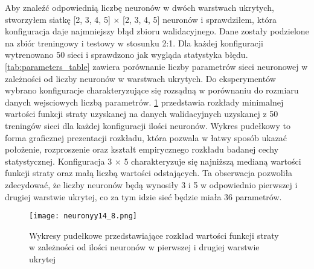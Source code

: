 \documentclass[11pt]{book}
\theoremstyle{definition}
\begin{document}
Aby znaleźć odpowiednią liczbę neuronów w dwóch warstwach ukrytych, stworzyłem siatkę [2, 3, 4, 5] $\times$ [2, 3, 4, 5] neuronów i sprawdziłem, która konfiguracja daje najmniejszy błąd zbioru walidacyjnego. Dane zostały podzielone na zbiór treningowy i testowy w stosunku 2:1. Dla każdej konfiguracji wytrenowano 50 sieci i sprawdzono jak wygląda statystyka błędu. \tablename{} \ref{tab:parameters_table} zawiera porównanie liczby parametrów sieci neuronowej w zależności od liczby neuronów w warstwach ukrytych. Do eksperymentów wybrano konfiguracje charakteryzujące się rozsądną w porównaniu do rozmiaru danych wejsciowych liczbą parametrów. \figurename{} \ref{fig:neurony} przedstawia rozkłady minimalnej wartości funkcji straty uzyskanej na danych walidacyjnych uzyskanej z 50 treningów sieci dla każdej konfiguracji ilości neuronów. Wykres pudełkowy to forma graficznej prezentacji rozkładu, która pozwala w łatwy sposób ukazać położenie, rozproszenie oraz kształt empirycznego rozkładu badanej cechy statystycznej. Konfiguracja 3 $\times$ 5 charakteryzuje się najniższą medianą wartości funkcji straty oraz małą liczbą wartości odstających. Ta obserwacja pozwoliła zdecydować, że liczby neuronów będą wynosiły 3 i 5 w odpowiednio pierwszej i drugiej warstwie ukrytej, co za tym idzie sieć będzie miała 36 parametrów.




\begin{figure}[htp!]
	\centering
	\texttt{[image: neuronyy14\_8.png]}
	\caption{Wykresy pudełkowe przedstawiające rozkład wartości funkcji straty w zależności od ilości neuronów w pierwszej i drugiej warstwie ukrytej}
	\label{fig:neurony}
\end{figure}
\end{document}

